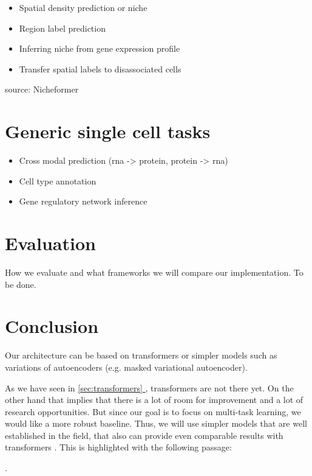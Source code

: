 \documentclass[12pt, a4paper]{article}
\newcommand*{\fullref}[1]{\hyperref[{#1}]{\ref*{#1} \nameref*{#1}}}
\begin{document}
\begin{itemize}
  \item Spatial density prediction or niche 
  \item Region label prediction 
  \item Inferring niche from gene expression profile
  \item Transfer spatial labels to disassociated cells
\end{itemize}
source: Nicheformer

\section{Generic single cell tasks}

\begin{itemize}
  \item Cross modal prediction (rna -> protein, protein -> rna)
  \item Cell type annotation
  \item Gene regulatory network inference
\end{itemize}

\section{Evaluation}

How we evaluate and what frameworks we will compare our implementation. To be done.

\clearpage

\section{Conclusion}

Our architecture can be based on transformers or simpler models such as variations of autoencoders (e.g. masked variational autoencoder).

As we have seen in \fullref{sec:transformers}, transformers are not there yet. On the other hand that implies that there is a lot of room for improvement and a lot of research opportunities. But since our goal is to focus on multi-task learning, we would like a more robust baseline. Thus, we will use simpler models that are well established in the field, that also can provide even comparable results with transformers \cite{szalataTransformersSinglecellOmics2024}. This is highlighted with the following passage:

 \cite{szalataTransformersSinglecellOmics2024}.
\end{document}
